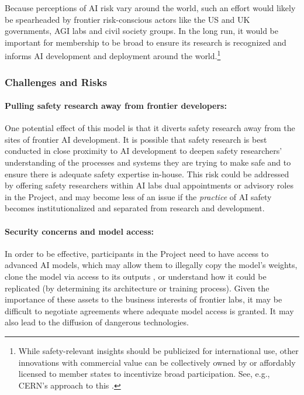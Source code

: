 \documentclass[12pt]{article}
\begin{document}
Because perceptions of AI risk vary around the world, such an effort
would likely be spearheaded by frontier risk-conscious actors like the
US and UK governments, AGI labs and civil society groups. In the long
run, it would be important for membership to be broad to ensure its
research is recognized and informs AI development and deployment around
the world.\footnote{While safety-relevant insights should be publicized
for international use, other innovations with commercial value can be
collectively owned by or affordably licensed to member states to
incentivize broad participation. See, e.g., CERN's approach to this
\cite{le_gall_how_2021}.}


\subsubsection*{Challenges and Risks}

\paragraph{Pulling safety research away from frontier developers:} One potential
effect of this model is that it diverts safety research away from the
sites of frontier AI development. It is possible that safety research
is best conducted in close proximity to AI development to deepen safety
researchers' understanding of the processes and systems they are trying
to make safe and to ensure there is adequate safety expertise in-house.
This risk could be addressed by offering safety researchers within AI
labs dual appointments or advisory roles in the Project, and may become
less of an issue if the \emph{practice} of AI safety becomes
institutionalized and separated from research and development.

\paragraph{Security concerns and model access:} In order to be effective,
participants in the Project need to have access to advanced AI models,
which may allow them to illegally copy the model's weights, clone the
model via access to its outputs \cite{taori_alpaca_2023},
or understand how it could be replicated (by determining its
architecture or training process). Given the importance of these assets
to the business interests of frontier labs, it may be difficult to
negotiate agreements where adequate model access is granted. It may also
lead to the diffusion of dangerous technologies.
\end{document}
